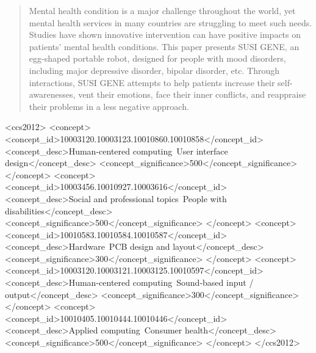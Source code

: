 \documentclass[manuscript,screen]{acmart}
\begin{document}
\begin{abstract}

  Mental health condition is a major challenge throughout the world, yet mental health services in many countries are struggling to meet such needs. Studies have shown innovative intervention can have positive impacts on patients' mental health conditions. This paper presents SUSI GENE, an egg-shaped portable robot, designed for people with mood disorders, including major depressive disorder, bipolar disorder, etc. Through interactions, SUSI GENE attempts to help patients increase their self-awarenesses, vent their emotions, face their inner conflicts, and reappraise their problems in a less negative approach.

\end{abstract}


\begin{CCSXML}
  <ccs2012>
     <concept>
         <concept_id>10003120.10003123.10010860.10010858</concept_id>
         <concept_desc>Human-centered computing~User interface design</concept_desc>
         <concept_significance>500</concept_significance>
         </concept>
     <concept>
         <concept_id>10003456.10010927.10003616</concept_id>
         <concept_desc>Social and professional topics~People with disabilities</concept_desc>
         <concept_significance>500</concept_significance>
         </concept>
     <concept>
         <concept_id>10010583.10010584.10010587</concept_id>
         <concept_desc>Hardware~PCB design and layout</concept_desc>
         <concept_significance>300</concept_significance>
         </concept>
     <concept>
         <concept_id>10003120.10003121.10003125.10010597</concept_id>
         <concept_desc>Human-centered computing~Sound-based input / output</concept_desc>
         <concept_significance>300</concept_significance>
         </concept>
     <concept>
         <concept_id>10010405.10010444.10010446</concept_id>
         <concept_desc>Applied computing~Consumer health</concept_desc>
         <concept_significance>500</concept_significance>
         </concept>
   </ccs2012>
\end{CCSXML}
\end{document}
